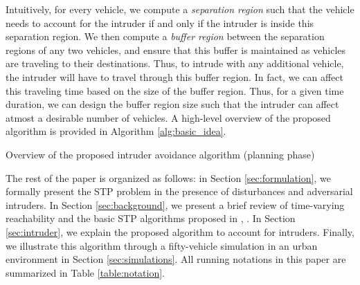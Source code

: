 Intuitively, for every vehicle, we compute a \textit{separation region} such that the vehicle needs to account for the intruder if and only if the intruder is inside this separation region. We then compute a \textit{buffer region} between the separation regions of any two vehicles, and ensure that this buffer is maintained as vehicles are traveling to their destinations. Thus, to intrude with any additional vehicle, the intruder will have to travel through this buffer region. In fact, we can affect this traveling time based on the size of the buffer region. Thus, for a given time duration, we can design the buffer region size such that the intruder can affect atmost a desirable number of vehicles. A high-level overview of the proposed algorithm is provided in Algorithm \ref{alg:basic_idea}.    
%
\begin{algorithm}[tb]
	\DontPrintSemicolon
	\caption{Overview of the proposed intruder avoidance algorithm (planning phase)}
	\label{alg:basic_idea}
\end{algorithm}
%

The rest of the paper is organized as follows: in Section \ref{sec:formulation}, we formally present the STP problem in the presence of disturbances and adversarial intruders. In Section \ref{sec:background}, we present a brief review of time-varying reachability and the basic STP algorithms proposed in \cite{Chen15c}, \cite{Bansal2017}. In Section \ref{sec:intruder}, we explain the proposed algorithm to account for intruders. Finally, we illustrate this algorithm through a fifty-vehicle simulation in an urban environment in Section \ref{sec:simulations}. All running notations in this paper are summarized in Table \ref{table:notation}.